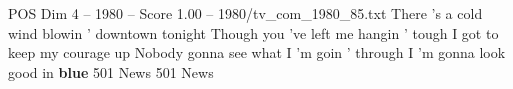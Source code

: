 \begin{textsample}{POS Dim 4 – 1980 – Score 1.00 – 1980/tv\_com\_1980\_85.txt}  \label{ex:f4_pos_068}
There 's a cold wind blowin ' downtown tonight Though you 've left me hangin ' tough I got to keep my courage up Nobody gonna see what I 'm goin ' through I 'm gonna look good in \textbf{blue} 501 News 501 News

\end{textsample}
